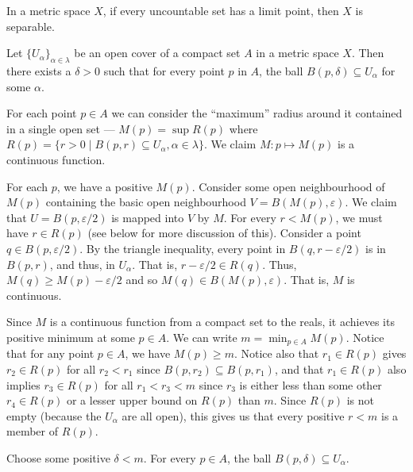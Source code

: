 \documentclass[12 pt, letterpaper]{hmcpset}
\begin{document}
\pagebreak

\begin{problem}[9.11, (4) $\implies$ (1)]
	In a metric space $X$, if every uncountable set has a limit point, then $X$ is separable.
\end{problem}

\pagebreak

\begin{problem}[9.24]
	Let $\{ U_{\alpha} \}_{\alpha \in \lambda}$ be an open cover of a compact set $A$ in a metric space $X$. Then there exists a $\delta > 0$ such that for every point $p$ in $A$, the ball $B(p, \delta) \subseteq U_{\alpha}$ for some $\alpha$.
\end{problem}

\begin{solution}
	For each point $p \in A$ we can consider the ``maximum'' radius around it contained in a single open set --- $M(p) = \sup R(p)$ where $R(p) = \{ r > 0 \mid B(p, r) \subseteq U_{\alpha}, \alpha \in \lambda \}$. We claim $M : p \mapsto M(p)$ is a continuous function.

	For each $p$, we have a positive $M(p)$. Consider some open neighbourhood of $M(p)$ containing the basic open neighbourhood $V = B(M(p), \varepsilon)$. We claim that $U = B(p, \varepsilon/2)$ is mapped into $V$ by $M$. For every $r < M(p)$, we must have $r \in R(p)$ (see below for more discussion of this). Consider a point $q \in B(p, \varepsilon/2)$. By the triangle inequality, every point in $B(q, r - \varepsilon/2)$ is in $B(p, r)$, and thus, in $U_{\alpha}$. That is, $r - \varepsilon/2 \in R(q)$. Thus, $M(q) \ge M(p) - \varepsilon /2$ and so $M(q) \in B(M(p), \varepsilon)$. That is, $M$ is continuous.

	Since $M$ is a continuous function from a compact set to the reals, it achieves its positive minimum at some $p \in A$. We can write $m = \min_{p \in A} M(p)$. Notice that for any point $p \in A$, we have $M(p) \ge m$. Notice also that $r_{1} \in R(p)$ gives $r_{2} \in R(p)$ for all $r_{2} < r_{1}$ since $B(p, r_{2}) \subseteq B(p, r_{1})$, and that $r_{1} \in R(p)$ also implies $r_{3} \in R(p)$ for all $r_{1} < r_{3} < m$ since $r_{3}$ is either less than some other $r_{4} \in R(p)$ or a lesser upper bound on $R(p)$ than $m$. Since $R(p)$ is not empty (because the $U_{\alpha}$ are all open), this gives us that every positive $r < m$ is a member of $R(p)$.

	Choose some positive $\delta < m$. For every $p \in A$, the ball $B(p, \delta) \subseteq U_{\alpha}$.
\end{solution}
\end{document}
